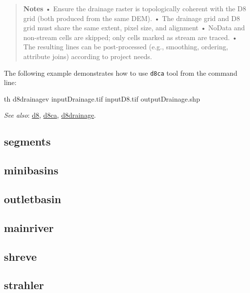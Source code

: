 \documentclass[
]{book}
\newenvironment{Shaded}{\begin{snugshade}}{\end{snugshade}}
\newcommand{\ExtensionTok}[1]{#1}
\newcommand{\NormalTok}[1]{#1}
\theoremstyle{definition}
\theoremstyle{definition}
\theoremstyle{definition}
\theoremstyle{definition}
\theoremstyle{remark}
\begin{document}
\begin{quote}
\textbf{Notes}
• Ensure the drainage raster is topologically coherent with the D8 grid (both produced from the same DEM).
• The drainage grid and D8 grid must share the same extent, pixel size, and alignment
• NoData and non-stream cells are skipped; only cells marked as stream are traced.
• The resulting lines can be post-processed (e.g., smoothing, ordering, attribute joins) according to project needs.
\end{quote}

The following example demonstrates how to use \texttt{d8ca} tool from the command line:

\begin{Shaded}
\begin{Highlighting}[]
\ExtensionTok{th}\NormalTok{ d8drainagev inputDrainage.tif inputD8.tif outputDrainage.shp}
\end{Highlighting}
\end{Shaded}

\emph{See also}: \hyperref[d8]{d8}, \hyperref[d8ca]{d8ca}, \hyperref[d8drainage]{d8drainage}.

\subsection{segments}\label{segments}

\subsection{minibasins}\label{minibasins}

\subsection{outletbasin}\label{outletbasin}

\subsection{mainriver}\label{mainriver}

\subsection{shreve}\label{shreve}

\subsection{strahler}\label{strahler}
\end{document}
